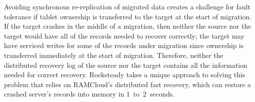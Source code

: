 %
%

Avoiding synchronous re-replication of migrated data creates a
challenge for fault tolerance if tablet ownership is transferred to the target
at the start of migration. If the target crashes in the middle of a migration,
then neither the source nor the target would have all of the records needed to
recover correctly; the target may have serviced writes for some of the records
under migration since ownership is transferred immediately at the start of
migration.  Therefore, neither the distributed recovery log
of the source nor the target contains all the information needed for correct
recovery. Rocksteady takes a unique approach to solving this problem that
relies on RAMCloud's distributed fast recovery, which can restore a crashed
server's records into memory in 1~to~2~seconds.

